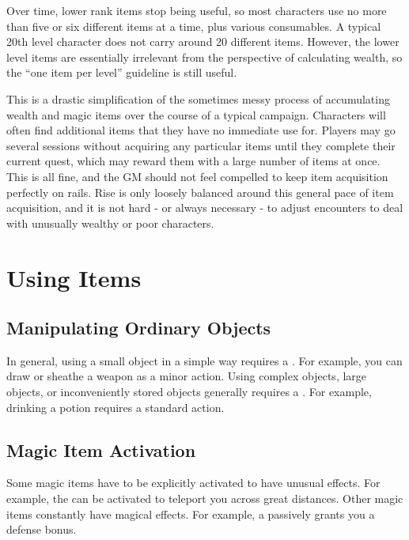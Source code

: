         Over time, lower rank items stop being useful, so most characters use no more than five or six different items at a time, plus various consumables.
        A typical 20th level character does not carry around 20 different items.
        However, the lower level items are essentially irrelevant from the perspective of calculating wealth, so the ``one item per level'' guideline is still useful.

        This is a drastic simplification of the sometimes messy process of accumulating wealth and magic items over the course of a typical campaign.
        Characters will often find additional items that they have no immediate use for.
        Players may go several sessions without acquiring any particular items until they complete their current quest, which may reward them with a large number of items at once.
        This is all fine, and the GM should not feel compelled to keep item acquisition perfectly on rails.
        Rise is only loosely balanced around this general pace of item acquisition, and it is not hard - or always necessary - to adjust encounters to deal with unusually wealthy or poor characters.

\section{Using Items}

    \subsection{Manipulating Ordinary Objects}
        In general, using a small object in a simple way requires a .
        For example, you can draw or sheathe a weapon as a minor action.
        Using complex objects, large objects, or inconveniently stored objects generally requires a .
        For example, drinking a potion requires a standard action.

    \subsection{Magic Item Activation}

        Some magic items have to be explicitly activated to have unusual effects.
        For example, the  can be activated to teleport you across great distances.
        Other magic items constantly have magical effects.
        For example, a  passively grants you a defense bonus.

